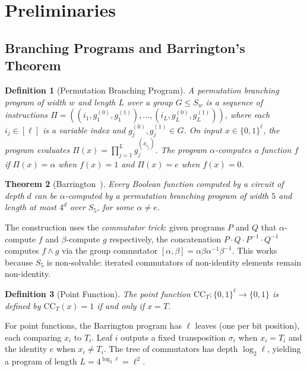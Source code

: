 \documentclass[11pt]{article}
\newtheorem{theorem}{Theorem}[section]
\newtheorem{definition}[theorem]{Definition}
\newcommand{\CC}{\mathrm{CC}}
\begin{document}
\section{Preliminaries}
\label{sec:prelim}

\subsection{Branching Programs and Barrington's Theorem}

\begin{definition}[Permutation Branching Program]
A \emph{permutation branching program} of width $w$ and length $L$ over a group
$G \leq S_w$ is a sequence of instructions
$\Pi = ((i_1, g_1^{(0)}, g_1^{(1)}), \ldots, (i_L, g_L^{(0)}, g_L^{(1)}))$,
where each $i_j \in [\ell]$ is a variable index and $g_j^{(0)}, g_j^{(1)} \in G$.
On input $x \in \{0,1\}^\ell$, the program evaluates
$\Pi(x) = \prod_{j=1}^{L} g_j^{(x_{i_j})}$.
The program $\alpha$-\emph{computes} a function $f$ if $\Pi(x) = \alpha$ when
$f(x) = 1$ and $\Pi(x) = e$ when $f(x) = 0$.
\end{definition}

\begin{theorem}[Barrington~\cite{Bar89}]
\label{thm:barrington}
Every Boolean function computed by a circuit of depth $d$ can be
$\alpha$-computed by a permutation branching program of width $5$ and
length at most $4^d$ over $S_5$, for some $\alpha \neq e$.
\end{theorem}

The construction uses the \emph{commutator trick}: given programs $P$ and $Q$
that $\alpha$-compute $f$ and $\beta$-compute $g$ respectively, the concatenation
$P \cdot Q \cdot P^{-1} \cdot Q^{-1}$ computes $f \wedge g$ via the group
commutator $[\alpha, \beta] = \alpha\beta\alpha^{-1}\beta^{-1}$. This works because
$S_5$ is non-solvable: iterated commutators of non-identity elements remain
non-identity.

\begin{definition}[Point Function]
The point function $\CC_T : \{0,1\}^\ell \to \{0,1\}$ is defined by
$\CC_T(x) = 1$ if and only if $x = T$.
\end{definition}

For point functions, the Barrington program has $\ell$ leaves (one per bit position),
each comparing $x_i$ to $T_i$. Leaf $i$ outputs a fixed transposition $\sigma_i$
when $x_i = T_i$ and the identity $e$ when $x_i \neq T_i$. The tree of
commutators has depth $\log_2 \ell$, yielding a program of length $L = 4^{\log_2 \ell}
= \ell^2$.
\end{document}

